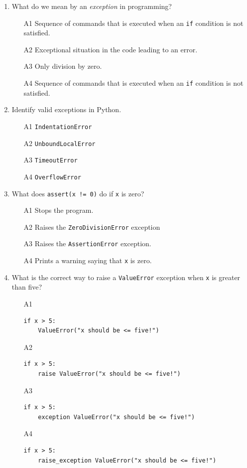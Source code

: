 \begin{enumerate}
\item What do we mean by an {\em exception} in programming?
\begin{enumerate}
\item[A1] Sequence of commands that is executed when an {\tt if} condition is not satisfied.
\item[A2] Exceptional situation in the code leading to an error. 
\item[A3] Only division by zero.
\item[A4] Sequence of commands that is executed when an {\tt if} condition is not satisfied.
\end{enumerate}
\item Identify valid exceptions in Python.
\begin{enumerate}
\item[A1] {\tt IndentationError}
\item[A2] {\tt UnboundLocalError}
\item[A3] {\tt TimeoutError}
\item[A4] {\tt OverflowError}
\end{enumerate}
\item What does {\tt assert(x != 0)} do if {\tt x} is zero?
\begin{enumerate}
\item[A1] Stops the program.
\item[A2] Raises the {\tt ZeroDivisionError} exception 
\item[A3] Raises the {\tt AssertionError} exception.
\item[A4] Prints a warning saying that {\tt x} is zero.
\end{enumerate}
\item What is the correct way to raise a {\tt ValueError} exception 
      when {\tt x} is greater than five?
\begin{enumerate}
\item[A1] 
\begin{verbatim}
if x > 5:
    ValueError("x should be <= five!")
\end{verbatim}
\item[A2] 
\begin{verbatim}
if x > 5:
    raise ValueError("x should be <= five!")
\end{verbatim}
\item[A3] 
\begin{verbatim}
if x > 5:
    exception ValueError("x should be <= five!")
\end{verbatim}
\item[A4] 
\begin{verbatim}
if x > 5:
    raise_exception ValueError("x should be <= five!")
\end{verbatim}
\end{enumerate}
\end{enumerate}


